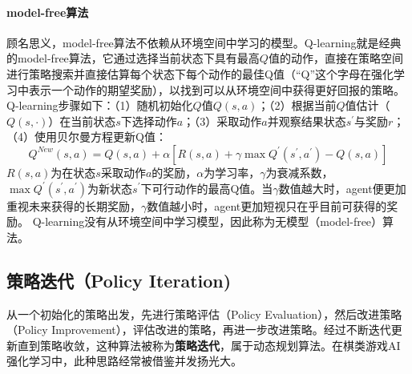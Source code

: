 \paragraph{model-free算法}
顾名思义，model-free算法不依赖从环境空间中学习的模型。Q-learning\cite{vanHasselt2012}就是经典的model-free算法\cite{Sutton1998,tdgam,TechnicalNote}，它通过选择当前状态下具有最高$Q$值的动作，直接在策略空间进行策略搜索并直接估算每个状态下每个动作的最佳Q值（“Q”这个字母在强化学习中表示一个动作的期望奖励），以找到可以从环境空间中获得更好回报的策略。
Q-learning步骤如下：（1）随机初始化$Q$值$Q(s,a)$；（2）根据当前$Q$值估计（$Q(s,\cdot)$）在当前状态$s$下选择动作$a$；（3）采取动作$a$并观察结果状态$s^{'}$与奖励$r$；（4）使用贝尔曼方程\cite{dixit1990optimization}更新Q值：
\begin{equation}
  Q^{New}(s,a) = Q(s,a) + \alpha[R(s,a) + \gamma \max Q^{'}(s^{'},a^{'}) - Q(s,a)]
\end{equation}
$R(s,a)$为在状态$s$采取动作$a$的奖励，$\alpha$为学习率，$\gamma$为衰减系数，$\max Q^{'}(s^{'},a^{'})$为新状态$s^{'}$下可行动作的最高Q值。当$\gamma$数值越大时，agent便更加重视未来获得的长期奖励，$\gamma$数值越小时，agent更加短视只在乎目前可获得的奖励。
Q-learning没有从环境空间中学习模型，因此称为无模型（model-free）算法。

\subsection{策略迭代（Policy Iteration)}
从一个初始化的策略出发，先进行策略评估（Policy Evaluation），然后改进策略（Policy Improvement），评估改进的策略，再进一步改进策略。经过不断迭代更新直到策略收敛，这种算法被称为\textbf{策略迭代}，属于动态规划算法\cite{Sutton1998}。在棋类游戏AI强化学习中，此种思路经常被借鉴并发扬光大\cite{Silver1140,Silver2017,Silver2016}。
